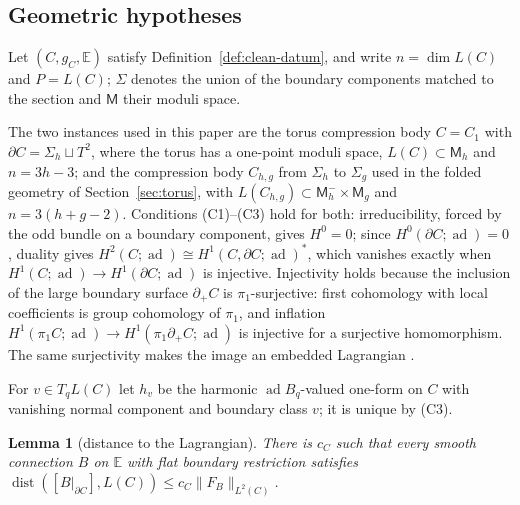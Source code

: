 \documentclass[11pt]{amsart}
\newtheorem{lemma}[theorem]{Lemma}
\theoremstyle{definition}
\theoremstyle{remark}
\theoremstyle{plain}
\numberwithin{equation}{section}
\newcommand{\ad}{\operatorname{ad}}
\newcommand{\Msf}{\mathsf{M}}
\newcommand{\dist}{\operatorname{dist}}
\begin{document}
\subsection{Geometric hypotheses}\label{subsec:clean-data}

Let $(C,g_C,\mathbb E)$ satisfy Definition~\ref{def:clean-datum},
and write $n=\dim L(C)$ and $P=L(C)$; $\Sigma$ denotes the union of the boundary
components matched to the section and $\Msf$ their moduli space.

The two instances used in this paper are the torus compression body
$C=C_1$ with $\partial C=\Sigma_h\sqcup T^2$, where the torus has a
one-point moduli space, $L(C)\subset\Msf_h$ and $n=3h-3$; and the
compression body $C_{h,g}$ from $\Sigma_h$ to $\Sigma_g$ used in the
folded geometry of Section~\ref{sec:torus}, with
$L(C_{h,g})\subset\Msf_h^-\times\Msf_g$ and $n=3(h+g-2)$. Conditions
(C1)--(C3) hold for both: irreducibility, forced by the odd bundle on a
boundary component, gives $H^0=0$; since $H^0(\partial C;\ad)=0$, duality
gives $H^2(C;\ad)\cong H^1(C,\partial C;\ad)^*$, which vanishes exactly when
$H^1(C;\ad)\to H^1(\partial C;\ad)$ is injective. Injectivity holds because
the inclusion of the large boundary surface $\partial_+C$ is $\pi_1$-surjective:
first cohomology with local coefficients is group cohomology of $\pi_1$, and
inflation $H^1(\pi_1C;\ad)\to H^1(\pi_1\partial_+C;\ad)$ is injective for a
surjective homomorphism. The same surjectivity makes the image an embedded
Lagrangian \cite[Proposition~2.21]{DFL}.

For $v\in T_qL(C)$ let $h_v$ be the harmonic $\ad B_q$-valued one-form on
$C$ with vanishing normal component and boundary class $v$; it is unique
by (C3).

\begin{lemma}[distance to the Lagrangian]\label{lem:distance}
There is $c_C$ such that every smooth connection $B$ on $\mathbb E$ with
flat boundary restriction satisfies
$\dist([B|_{\partial C}],L(C))\le c_C\|F_B\|_{L^2(C)}$.
\end{lemma}
\end{document}
